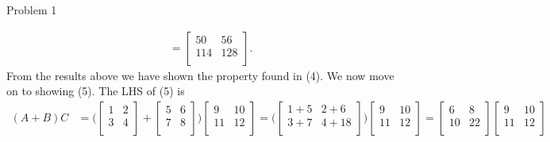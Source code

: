 \begin{problem}{Problem 1}
\begin{highlight}[Solution]
\begin{align*}
            & =
            \begin{bmatrix}
                50 & 56 \\
                114 & 128 \\
            \end{bmatrix}.
        \end{align*}
        From the results above we have shown the property found in (4). We now move on to showing (5). The LHS of (5) is
        \begin{align*}
            (A + B)C & = 
            \Bigg(
                \begin{bmatrix}
                    1 & 2 \\
                    3 & 4 \\
                \end{bmatrix}
                + 
                \begin{bmatrix}
                    5 & 6 \\
                    7 & 8 \\
                \end{bmatrix}
            \Bigg)
            \begin{bmatrix}
                9 & 10 \\
                11 & 12 \\
            \end{bmatrix}
            =
            \Biggl(
                \begin{bmatrix}
                    1 + 5 & 2 + 6 \\
                    3 + 7 & 4 + 18 \\
                \end{bmatrix}
            \Biggr)
            \begin{bmatrix}
                9 & 10 \\
                11 & 12 \\
            \end{bmatrix}
            = 
            \begin{bmatrix}
                6 & 8 \\
                10 & 22 \\
            \end{bmatrix}
            \begin{bmatrix}
                9 & 10 \\
                11 & 12 \\
            \end{bmatrix} \\

\end{align*}
\end{highlight}
\end{problem}
